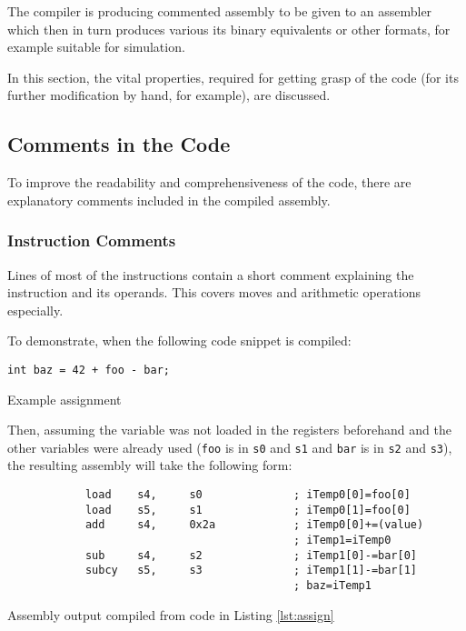     The compiler is producing commented assembly to be given to an assembler which then in turn produces various its binary equivalents or other formats, for example suitable for simulation.

    In this section, the vital properties, required for getting grasp of the code (for its further modification by hand, for example), are discussed.

        \subsection{Comments in the Code}

        To improve the readability and comprehensiveness of the code, there are explanatory comments included in the compiled assembly.

            \subsubsection{Instruction Comments}

            Lines of most of the instructions contain a short comment explaining the instruction and its operands. This covers moves and arithmetic operations especially.

            To demonstrate, when the following code snippet is compiled:

            \begin{listing}
            \centering
            \texttt{int baz = 42 + foo - bar;}
            \caption{Example assignment}\label{lst:assign}
            \end{listing}

            Then, assuming the variable was not loaded in the registers beforehand and the other variables were already used (\texttt{foo} is in \texttt{s0} and \texttt{s1} and \texttt{bar} is in \texttt{s2} and \texttt{s3}), the resulting assembly will take the following form:

            \begin{listing}
            \centering
            \begin{verbatim}
            load    s4,     s0              ; iTemp0[0]=foo[0]
            load    s5,     s1              ; iTemp0[1]=foo[0]
            add     s4,     0x2a            ; iTemp0[0]+=(value)
                                            ; iTemp1=iTemp0
            sub     s4,     s2              ; iTemp1[0]-=bar[0]
            subcy   s5,     s3              ; iTemp1[1]-=bar[1]
                                            ; baz=iTemp1
            \end{verbatim}
            \caption{Assembly output compiled from code in Listing \ref{lst:assign}}\label{lst:assignasm}
            \end{listing}

